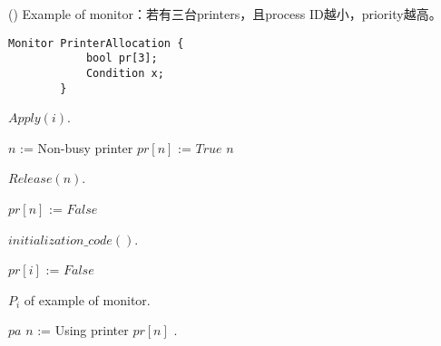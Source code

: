 \begin{theorem}{()} Example of monitor：若有三台printers，且process ID越小，priority越高。
    \begin{lstlisting}[caption={Data structure of example of monitor}, captionpos=b, mathescape=true]
        Monitor PrinterAllocation {
            bool pr[3];
            Condition x;
        } 
    \end{lstlisting}
    \begin{algorithm}[H]
        \caption{$Apply(i)$.}
        \begin{algorithmic}[1]
                    \State {}
                \Else
                    \State $n$ := Non-busy printer
                    \State $pr[n]$ := $True$
                    \State \Return $n$
                \EndIf
            \EndFunction
        \end{algorithmic}
    \end{algorithm}
    \begin{algorithm}[H]
        \caption{$Release(n)$.}
        \begin{algorithmic}[1]
                \State $pr[n]$ := $False$
                \State {}
            \EndFunction
        \end{algorithmic}
    \end{algorithm}
    \begin{algorithm}[H]
        \caption{$initialization\_code()$.}
        \begin{algorithmic}[1]
                    \State $pr[i]$ := $False$
                \EndFor
            \EndFunction
        \end{algorithmic}
    \end{algorithm}
    \begin{algorithm}[H]
        \caption{$P_i$ of example of monitor.}
        \begin{algorithmic}[1]
                \State {} $pa$ 
                \State $n$ := 
                \State Using printer $pr[n]$ .
                \State {}
            \EndFunction
        \end{algorithmic}
    \end{algorithm}
\end{theorem}

